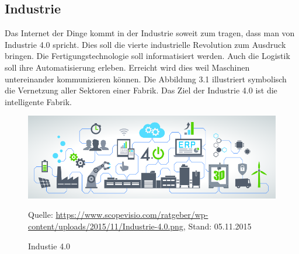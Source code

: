 \subsection{Industrie}
Das Internet der Dinge kommt in der Industrie soweit zum tragen, dass man von Industrie 4.0 spricht. Dies soll die vierte industrielle Revolution zum Ausdruck bringen. Die Fertigungstechnologie soll informatisiert werden. Auch die Logistik soll ihre Automatisierung erleben. Erreicht wird dies weil Maschinen untereinander kommunizieren können. Die Abbildung 3.1 illustriert symbolisch die Vernetzung aller Sektoren einer Fabrik. Das Ziel der Industrie 4.0 ist die intelligente Fabrik.
\begin{figure}[h]
  \centering
  \includegraphics[scale=0.62]{98_Bilder/03_Marktsegmente/industrie4}
  \caption[Industie 4.0 Symbolbild]{Industie 4.0}
  \footnotesize Quelle: \url{https://www.scopevisio.com/ratgeber/wp-content/uploads/2015/11/Industrie-4.0.png}, Stand: 05.11.2015
\end{figure}
\newpage

